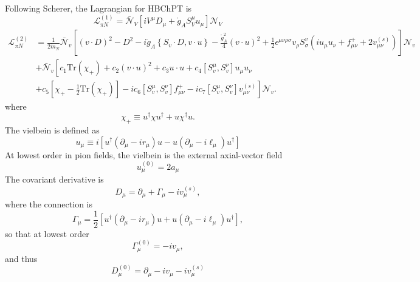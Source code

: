 \documentclass{book}[12pt]
\begin{document}
Following Scherer, the Lagrangian for HBChPT is
\begin{equation}
\mathcal{L}^{(1)}_{\pi N}=\bar{\mathcal{N}}_V\left[iV^{\mu}D_{\mu}+\mathring{g}_AS_V^{\mu}u_{\mu}\right]\mathcal{N}_V
\end{equation}
\begin{equation}
\begin{split}
\mathcal{L}^{(2)}_{\pi N}&=\frac{1}{2\mathring{m}_N}\bar{\mathcal{N}}_v\left[(v\cdot D)^2-D^2-i\mathring{g}_A\left\{S_v\cdot D,v\cdot u\right\}-\frac{\mathring{g}_A^2}{4}(v\cdot u)^2+\frac{1}{2}\epsilon^{\mu\nu\rho\sigma}v_{\rho}S^v_{\sigma}\left(iu_{\mu}u_{\nu}+f_{\mu\nu}^++2v_{\mu\nu}^{(s)}\right)\right]\mathcal{N}_v\\
&+\bar{\mathcal{N}}_v\left[c_1\mathrm{Tr}(\chi_+)+c_2(v\cdot u)^2+c_3 u\cdot u + c_4\left[S_v^{\mu},S_v^{\nu}\right]u_{\mu}u_{\nu}\right.\\
&\left.+c_5\left[\chi_+-\frac{1}{2}\mathrm{Tr}(\chi_+)\right]-ic_6\left[S_v^{\mu},S_v^{\nu}\right]f_{\mu\nu}^+-ic_7\left[S_v^{\mu},S_v^{\nu}\right]v^{(s)}_{\mu\nu}\right]\mathcal{N}_v.
\end{split}
\end{equation}
where
\begin{equation}
\chi_+\equiv u^{\dag}\chi u^{\dag} + u\chi^{\dag} u.
\end{equation}
The vielbein is defined as
\begin{equation}
u_{\mu}\equiv i\left[u^{\dag}(\partial_{\mu}-ir_{\mu})u-u(\partial_{\mu}-i\ell_{\mu})u^{\dag}\right]
\end{equation}
At lowest order in pion fields, the vielbein is the external axial-vector field
\begin{equation}
u^{(0)}_{\mu}=2a_{\mu}
\end{equation}
The covariant derivative is
\begin{equation}
D_{\mu}=\partial_{\mu}+\Gamma_{\mu}-iv_{\mu}^{(s)},
\end{equation}
where the connection is
\begin{equation}
\Gamma_{\mu}=\frac{1}{2}\left[u^{\dag}(\partial_{\mu}-ir_{\mu})u+u(\partial_{\mu}-i\ell_{\mu})u^{\dag}\right],
\end{equation}
so that at lowest order
\begin{equation}
\Gamma^{(0)}_{\mu}=-iv_{\mu},
\end{equation}
and thus
\begin{equation}
D^{(0)}_{\mu}=\partial_{\mu}-iv_{\mu}-iv_{\mu}^{(s)}
\end{equation}
\end{document}
